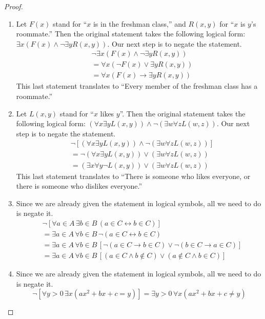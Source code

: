 \documentclass[12pt]{amsart}
\theoremstyle{definition}
\theoremstyle{remark}
\begin{document}
\begin{proof}
\hfill
\begin{enumerate}
	\item Let $F(x)$ stand for ``$x$ is in the freshman class,'' and $R(x, y)$ for ``$x$ is $y$'s roommate.''
	Then the original statement takes the following logical form:
	$\exists x (F(x) \wedge \neg \exists y R(x, y))$.
	Our next step is to negate the statement.
	\begin{align*}
		& \neg \exists x (F(x) \wedge \neg \exists y R(x, y)) \\
		&= \forall x (\neg F(x) \vee \exists y R(x, y)) \\
		&= \forall x (F(x) \rightarrow \exists y R(x, y))
	\end{align*}
	This last statement translates to ``Every member of the freshman class has a roommate.''
	
	\item Let $L(x, y)$ stand for ``$x$ likes $y$''.
	Then the original statement takes the following logical form:
	$(\forall x \exists y L(x, y)) \wedge \neg (\exists w \forall z L(w, z))$.
	Our next step is to negate the statement.
	\begin{align*}
		& \neg [(\forall x \exists y L(x, y)) \wedge \neg (\exists w \forall z L(w, z))] \\
		&= \neg (\forall x \exists y L(x, y)) \vee (\exists w \forall z L(w, z)) \\
		&= (\exists x \forall y \neg L(x, y)) \vee (\exists w \forall z L(w, z))
	\end{align*}
	This last statement translates to ``There is someone who likes everyone, or there is someone who dislikes everyone.''
	
	\item Since we are already given the statement in logical symbols, all we need to do is negate it.
	\begin{align*}
		& \neg [\forall a \in A \, \exists b \in B \, (a \in C \leftrightarrow b \in C)] \\
		&= \exists a \in A \, \forall b \in B \, \neg (a \in C \leftrightarrow b \in C) \\
		&= \exists a \in A \, \forall b \in B \, 
			[\neg (a \in C \rightarrow b \in C) \vee \neg (b \in C \rightarrow a \in C)] \\
		&= \exists a \in A \, \forall b \in B \,
			[(a \in C \wedge b \notin C) \vee (a \notin C \wedge b \in C)]
	\end{align*}
	
	\item Since we are already given the statement in logical symbols, all we need to do is negate it.
	\begin{equation*}
		\neg [\forall y > 0 \, \exists x (ax^2 + bx + c = y)]
		= \exists y > 0 \, \forall x (ax^2 + bx + c \neq y)
	\end{equation*}
\end{enumerate}	
\end{proof}
\end{document}
